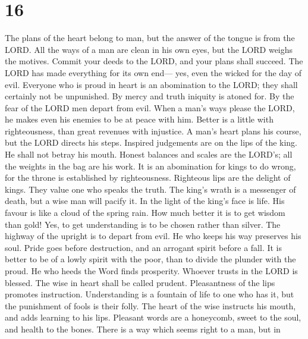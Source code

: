 \hypertarget{section-15}{%
\section{16}\label{section-15}}

 The plans of the heart belong to man, but the answer of the
tongue is from the LORD.  All the ways of a man are clean in
his own eyes, but the LORD weighs the motives.  Commit your
deeds to the LORD, and your plans shall succeed.  The LORD
has made everything for its own end--- yes, even the wicked for the day
of evil.  Everyone who is proud in heart is an abomination
to the LORD; they shall certainly not be unpunished.  By
mercy and truth iniquity is atoned for. By the fear of the LORD men
depart from evil.  When a man's ways please the LORD, he
makes even his enemies to be at peace with him.  Better is a
little with righteousness, than great revenues with injustice.
 A man's heart plans his course, but the LORD directs his
steps.  Inspired judgements are on the lips of the king. He
shall not betray his mouth.  Honest balances and scales are
the LORD's; all the weights in the bag are his work.  It is
an abomination for kings to do wrong, for the throne is established by
righteousness.  Righteous lips are the delight of kings.
They value one who speaks the truth.  The king's wrath is a
messenger of death, but a wise man will pacify it.  In the
light of the king's face is life. His favour is like a cloud of the
spring rain.  How much better it is to get wisdom than
gold! Yes, to get understanding is to be chosen rather than silver.
 The highway of the upright is to depart from evil. He who
keeps his way preserves his soul.  Pride goes before
destruction, and an arrogant spirit before a fall.  It is
better to be of a lowly spirit with the poor, than to divide the plunder
with the proud.  He who heeds the Word finds prosperity.
Whoever trusts in the LORD is blessed.  The wise in heart
shall be called prudent. Pleasantness of the lips promotes instruction.
 Understanding is a fountain of life to one who has it, but
the punishment of fools is their folly.  The heart of the
wise instructs his mouth, and adds learning to his lips. 
Pleasant words are a honeycomb, sweet to the soul, and health to the
bones.  There is a way which seems right to a man, but in
